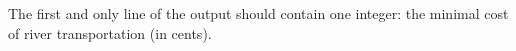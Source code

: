 The first and only line of the output should contain one integer: the minimal cost of river transportation (in cents).